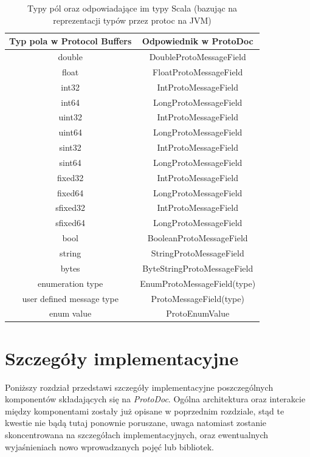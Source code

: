 \documentclass[pdflatex,11pt]{aghdpl}
\begin{document}
\begin{table}
 \begin{center}
\begin{tabular}[c]{|c|c|}
\hline 
Typ pola w Protocol Buffers & Odpowiednik w ProtoDoc\\ \hline

double   & DoubleProtoMessageField \\ \hline
float    & FloatProtoMessageField \\ \hline
int32    & IntProtoMessageField \\ \hline
int64    & LongProtoMessageField \\ \hline 
uint32   & IntProtoMessageField \\ \hline 
uint64   & LongProtoMessageField \\ \hline 
sint32   & IntProtoMessageField \\ \hline 
sint64   & LongProtoMessageField \\ \hline 
fixed32  & IntProtoMessageField \\ \hline 
fixed64  & LongProtoMessageField \\ \hline 
sfixed32 & IntProtoMessageField \\ \hline 
sfixed64 & LongProtoMessageField \\ \hline 
bool     & BooleanProtoMessageField \\ \hline
string   & StringProtoMessageField \\ \hline 
bytes    & ByteStringProtoMessageField \\ \hline \hline 
enumeration type & EnumProtoMessageField(type) \\ \hline
user defined message type & ProtoMessageField(type) \\ \hline \hline 
enum value & ProtoEnumValue \\ \hline
 \end{tabular}
 \end{center}
\caption{Typy pól oraz odpowiadające im typy Scala \small{(bazując na reprezentacji typów przez protoc na JVM)}}
\label{tab:field_types}
\end{table}


\chapter{Szczegóły implementacyjne}
\label{sec:zastosowanePodejscie}

Poniższy rozdział przedstawi szczegóły implementacyjne poszczególnych komponentów składających się na \textit{ProtoDoc}.
Ogólna architektura oraz interakcie między komponentami zostały już opisane w poprzednim rozdziale, stąd te kwestie nie bądą tutaj ponownie poruszane,
uwaga natomiast zostanie skoncentrowana na szczegółach implementacyjnych, oraz ewentualnych wyjaśnieniach nowo wprowadzanych pojęć lub bibliotek.
\end{document}

